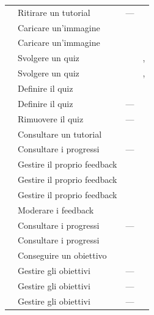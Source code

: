 \begin{longtable}{@{}l L{5.4cm} l L{4.2cm}@{}}
  &  Ritirare un tutorial       & ---        &  \\
  &  Caricare un'immagine       &  &  \\
 &  Caricare un'immagine       &  &  \\
\midrule
{}  &  Svolgere un quiz           &  & ,  \\
  &  Svolgere un quiz           &  & ,  \\
  &  Definire il quiz           &  &  \\
  &  Definire il quiz           & ---        &  \\
  &  Rimuovere il quiz          & ---        &  \\
\midrule
{}  &  Consultare un tutorial     &  &  \\
  &  Consultare i progressi     & ---        &  \\
  &  Gestire il proprio feedback &  &  \\
  &  Gestire il proprio feedback &  &  \\
  &  Gestire il proprio feedback &  &  \\
  &  Moderare i feedback        &  &  \\
\midrule
{}  &  Consultare i progressi     & ---        &  \\
  &  Consultare i progressi     &  &  \\
  &  Conseguire un obiettivo    &  &  \\
  &  Gestire gli obiettivi      & ---        &  \\
  &  Gestire gli obiettivi      & ---        &  \\
  &  Gestire gli obiettivi      & ---        &  \\

\end{longtable}

